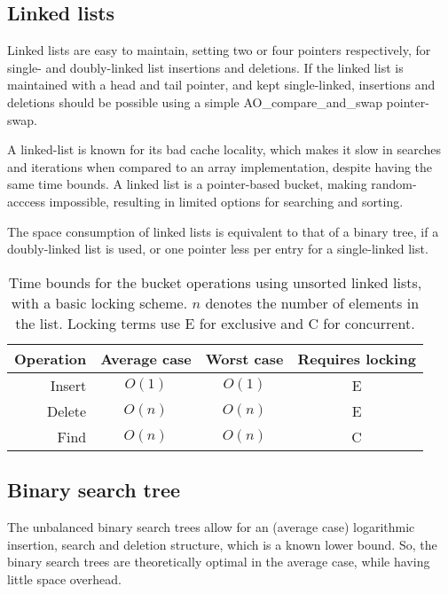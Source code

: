 \subsection{Linked lists}
Linked lists are easy to maintain, setting two or four pointers respectively, for
single- and doubly-linked list insertions and deletions.
If the linked list is maintained with a {\keyword head} and {\keyword tail} pointer,
and kept single-linked, insertions and deletions should be possible
using a simple {\keyword AO\_compare\_and\_swap} pointer-swap.

A linked-list is known for its bad cache locality, which makes it slow in
searches and iterations when compared to an array implementation, despite
having the same time bounds. A linked list is a pointer-based bucket, making
random-acccess impossible, resulting in limited options for searching and
sorting.

The space consumption of linked lists is equivalent to that of a binary tree,
if a doubly-linked list is used, or one pointer less per entry for a
single-linked list.

\begin{table}[h!]
    \centering
    \begin{tabular}[here]{ r || c | c | c}
        Operation & Average case & Worst case & Requires locking  \\ \hline
        Insert    & $O(1)$ & $O(1)$   & E  \\ \hline
        Delete    & $O(n)$ & $O(n)$   & E \\ \hline
        Find      & $O(n)$ & $O(n)$   & C  \\ \hline
    \end{tabular}
    \caption{Time bounds for the bucket operations using unsorted linked lists,
    with a basic locking scheme. $n$ denotes the number of elements in the
    list. Locking terms use E for exclusive and C for concurrent.}
    \label{tab:bounds:linked list}
\end{table}

\subsection{Binary search tree}
The unbalanced binary search trees allow for an (average case) logarithmic
insertion, search and deletion structure, which is a known lower bound. So, the
binary search trees are theoretically optimal in the average case, while having
little space overhead.

